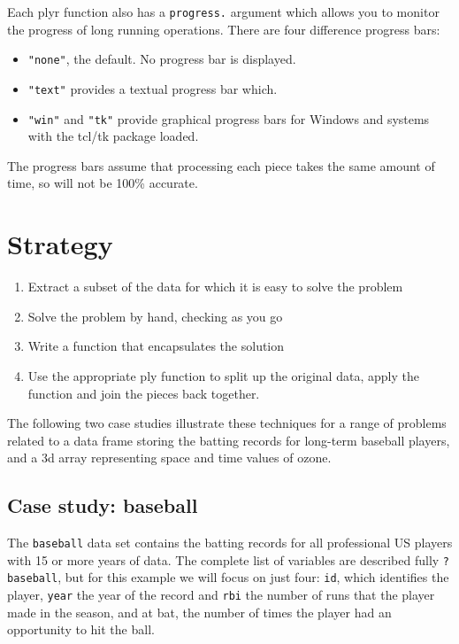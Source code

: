 \documentclass[letterpage]{scrartcl}
\begin{document}
Each plyr function also has a {\tt progress.} argument which allows you to monitor the progress of long running operations.  There are four difference progress bars:

\begin{itemize}
  \item {\tt "none"}, the default.  No progress bar is displayed.
  \item {\tt "text"} provides a textual progress bar which.
  \item {\tt "win"} and {\tt "tk"} provide graphical progress bars for Windows and systems with the tcl/tk package loaded.
\end{itemize}

The progress bars assume that processing each piece takes the same amount of time, so will not be 100\% accurate.

\section{Strategy}
\label{sec:strategy}



\begin{enumerate}
  \item Extract a subset of the data for which it is easy to solve the problem
  \item Solve the problem by hand, checking as you go
  \item Write a function that encapsulates the solution
  \item Use the appropriate ply function to split up the original data, apply the function and join the pieces back together.
  
\end{enumerate}

The following two case studies illustrate these techniques for a range of problems related to a data frame storing the batting records for long-term baseball players, and a 3d array representing space and time values of ozone.

\subsection{Case study: baseball}

The {\tt baseball} data set contains the batting records for all professional US players with 15 or more years of data.  The complete list of variables are described fully {\tt ?baseball}, but for this example we will focus on just four: {\tt id}, which identifies the player, {\tt year} the year of the record and {\tt rbi} the number of runs that the player made in the season, and {\tt} at bat, the number of times the player had an opportunity to hit the ball.
\end{document}
